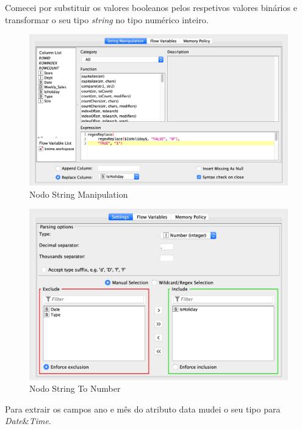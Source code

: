 Comecei por substituir os valores booleanos pelos respetivos valores binários e transformar o seu tipo \textit{string} no tipo numérico inteiro.

\begin{figure}[H]
    \centering
    \includegraphics[scale=0.3]{Images/T2_a1.png}
    \caption{Nodo String Manipulation}
\end{figure}

\begin{figure}[H]
    \centering
    \includegraphics[scale=0.3]{Images/T2_a2.png}
    \caption{Nodo String To Number}
\end{figure}

\clearpage

Para extrair os campos ano e mês do atributo data mudei o seu tipo para \textit{Date}\&\textit{Time}. 

